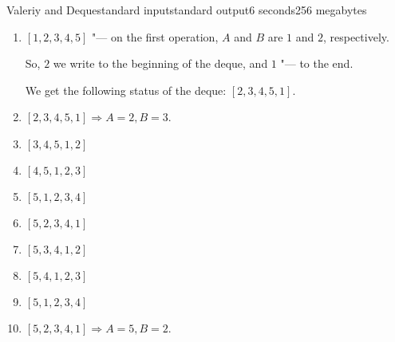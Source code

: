 \begin{problem}{Valeriy and Deque}{standard input}{standard output}{6 seconds}{256 megabytes}
\Note
\begin{enumerate}
Consider all 10 steps for the first test in detail:

\item $[1, 2, 3, 4, 5]$ "--- on the first operation, $A$ and $B$ are $1$ and $2$, respectively.

So, $2$ we write to the beginning of the deque, and $1$ "--- to the end.

We get the following status of the deque: $[2, 3, 4, 5, 1]$.

\item $[2, 3, 4, 5, 1] \Rightarrow A = 2, B = 3$.

\item $[3, 4, 5, 1, 2]$

\item $[4, 5, 1, 2, 3]$

\item $[5, 1, 2, 3, 4]$

\item $[5, 2, 3, 4, 1]$

\item $[5, 3, 4, 1, 2]$

\item $[5, 4, 1, 2, 3]$

\item $[5, 1, 2, 3, 4]$

\item $[5, 2, 3, 4, 1] \Rightarrow A = 5, B = 2$.
\end{enumerate}

\end{problem}
